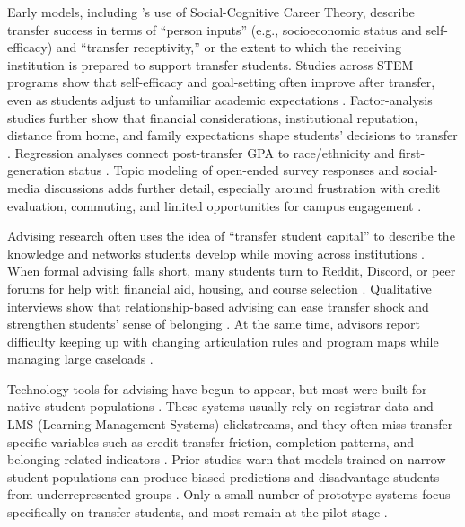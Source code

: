 \documentclass[letterpaper,11pt]{article}
\begin{document}
Early models, including \textcite{computingtransfer2024}'s use of Social-Cognitive Career Theory, describe transfer success in terms of ``person inputs'' (e.g., socioeconomic status and self-efficacy) and ``transfer receptivity,'' or the extent to which the receiving institution is prepared to support transfer students. Studies across STEM programs show that self-efficacy and goal-setting often improve after transfer, even as students adjust to unfamiliar academic expectations \parencite{socialcognitive2022}. Factor-analysis studies further show that financial considerations, institutional reputation, distance from home, and family expectations shape students' decisions to transfer \parencite{factoranalysis2023}. Regression analyses connect post-transfer GPA to race/ethnicity and first-generation status \parencite{computingtransfer2024}. Topic modeling of open-ended survey responses and social-media discussions adds further detail, especially around frustration with credit evaluation, commuting, and limited opportunities for campus engagement \parencite{standfast2024reddit}.

Advising research often uses the idea of ``transfer student capital'' to describe the knowledge and networks students develop while moving across institutions \parencite{lukszo2020}. When formal advising falls short, many students turn to Reddit, Discord, or peer forums for help with financial aid, housing, and course selection \parencite{standfast2024reddit}. Qualitative interviews show that relationship-based advising can ease transfer shock and strengthen students' sense of belonging \parencite{thiry2023}. At the same time, advisors report difficulty keeping up with changing articulation rules and program maps while managing large caseloads \parencite{nguyen2024community,nguyen2025school}.

Technology tools for advising have begun to appear, but most were built for native student populations \parencite{nguyen2024community}. These systems usually rely on registrar data and LMS (Learning Management Systems) clickstreams, and they often miss transfer-specific variables such as credit-transfer friction, completion patterns, and belonging-related indicators \parencite{nguyen2024community,nguyen2025school}. Prior studies warn that models trained on narrow student populations can produce biased predictions and disadvantage students from underrepresented groups \parencite{socialcognitive2022,computingtransfer2024}. Only a small number of prototype systems focus specifically on transfer students, and most remain at the pilot stage \parencite{topicmodeling2024}.
\end{document}
